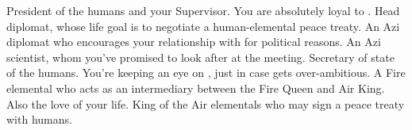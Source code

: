 \documentclass[char]{elementals}
\begin{document}
\begin{contacts}
  \contact{\cLeader{}} President of the humans and your Supervisor.  You are absolutely loyal to \cLeader{\them}.
  \contact{\cAvatar{}} Head diplomat, whose life goal is to negotiate a human-elemental peace treaty.
  \contact{\cDiplomat{}} An Azi diplomat who encourages your relationship with \cJuliet{} for political reasons.
  \contact{\cScientist{}} An Azi scientist, whom you've promised to look after at the meeting.
  \contact{\cDema{}} Secretary of state of the humans.  You're keeping an eye on \cDema{\them}, just in case \cDema{\they} gets over-ambitious.
  \contact{\cJuliet{}} A Fire elemental who acts as an intermediary between the Fire Queen and Air King.  Also the love of your life.
  \contact{\cKing{}} King of the Air elementals who may sign a peace treaty with humans.
\end{contacts}
\end{document}
